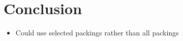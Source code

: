 \documentclass{elsarticle}
\begin{document}
\section{Conclusion}
\begin{itemize}
	\item Could use selected packings rather than all packings
\end{itemize}




\end{document}
